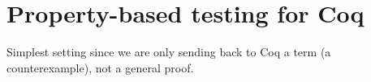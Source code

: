 \section{Property-based testing for Coq}

Simplest setting since we are only sending back to Coq a term (a
counterexample), not a general proof.  

